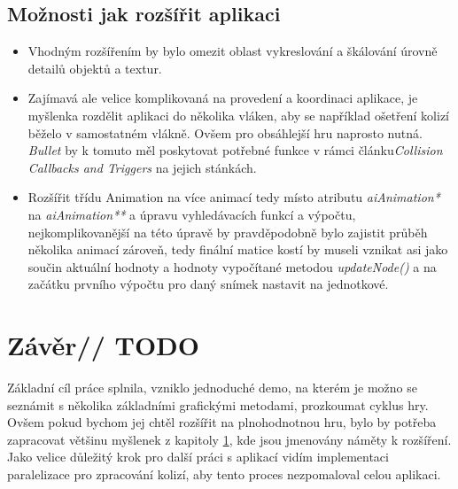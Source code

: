 \section{Možnosti jak rozšířit aplikaci}\label{extend} 
\begin{itemize}
	\item Vhodným rozšířením by bylo omezit oblast vykreslování a škálování úrovně detailů objektů a textur.
	\item 
	Zajímavá ale velice komplikovaná na provedení a koordinaci aplikace, je myšlenka rozdělit aplikaci do několika vláken, aby se například ošetření kolizí běželo v samostatném vlákně. Ovšem pro obsáhlejší hru naprosto nutná. \emph{Bullet} by k tomuto měl poskytovat potřebné funkce v rámci článku\emph{Collision Callbacks and Triggers}\cite{bullet-trigger} na jejich stánkách.
	\item Rozšířit třídu Animation na více animací tedy místo atributu \emph{aiAnimation*} na \emph{aiAnimation**} a úpravu vyhledávacích funkcí a výpočtu, nejkomplikovanější na této úpravě by pravděpodobně bylo zajistit průběh několika animací zároveň, tedy finální matice kostí by museli vznikat asi jako součin aktuální hodnoty a hodnoty vypočítané metodou \emph{updateNode()} a na začátku prvního výpočtu pro daný snímek nastavit na jednotkové.
\end{itemize}

\chapter{Závěr// TODO}
Základní cíl práce splnila, vzniklo jednoduché demo, na kterém je možno se seznámit s několika základními grafickými metodami, prozkoumat cyklus hry. Ovšem pokud bychom jej chtěl rozšířit na plnohodnotnou hru, bylo by potřeba zapracovat většinu myšlenek z kapitoly \ref{extend}, kde jsou jmenovány náměty k rozšíření. Jako velice důležitý krok pro další práci s aplikací vidím implementaci paralelizace pro zpracování kolizí, aby tento proces nezpomaloval celou aplikaci.  
